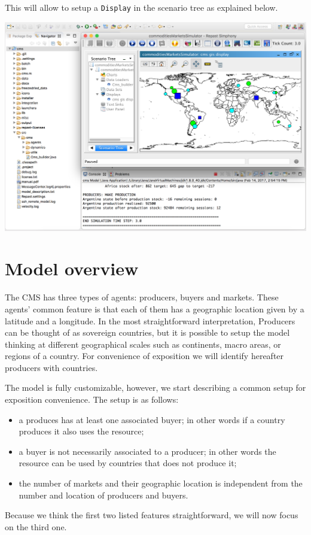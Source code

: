\documentclass{article}
\begin{document}
This will allow to setup a \verb+Display+ in the scenario tree as explained below.

\vskip2mm
\noindent
\includegraphics[scale=0.35]{fig_cms_rs_gui7}

\vskip2mm






\section{Model overview}

The CMS has three types of agents: producers, buyers and markets.
These agents' common feature is that each of them has a geographic location given by a latitude and a longitude. 
In the most straightforward interpretation, Producers can be thought of as sovereign countries, but it is possible to setup the model thinking at different geographical scales such as continents, macro areas, or regions of a country. For convenience of exposition we will identify hereafter producers with countries.

The model is fully customizable, however, we start describing a common setup for exposition convenience. The setup is as follows:
\begin{itemize}
	\item a produces has at least one associated buyer; in other words if a country produces it also uses the resource; 
	\item a buyer is not necessarily associated to a producer; in other words the resource can be used by countries that does not produce it;
	\item the number of markets and their geographic location is independent from the number and location of producers and buyers.
\end{itemize}
Because we think the first two listed features straightforward, we will now focus on the third one.
\end{document}
